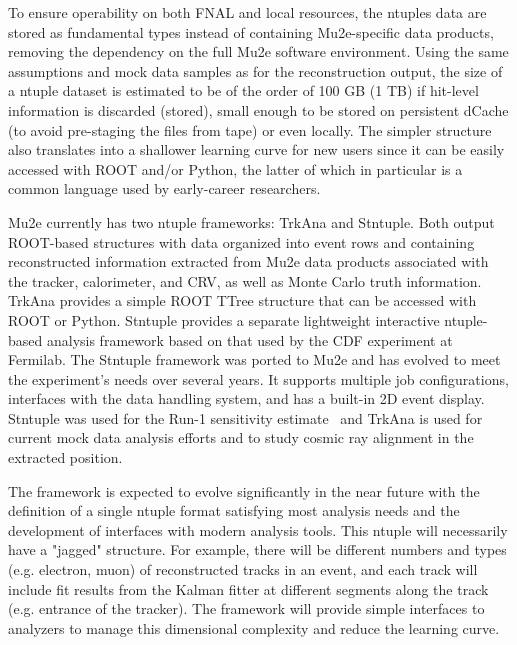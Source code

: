 To ensure operability on both FNAL and local resources, the ntuples data are stored as fundamental types instead of containing Mu2e-specific data products, removing the dependency on the full Mu2e software environment. Using the same assumptions and mock data samples as for the reconstruction output, the size of a ntuple dataset is estimated to be of the order of 100 GB (1 TB) if hit-level information is discarded (stored), small enough to be stored on persistent dCache (to avoid pre-staging the files from tape) or even locally. The simpler structure also translates into a shallower learning curve for new users since it can be easily accessed with ROOT and/or Python, the latter of which in particular is a common language used by early-career researchers.

Mu2e currently has two ntuple frameworks: TrkAna and Stntuple. Both output ROOT-based structures with data organized into event rows and containing reconstructed information extracted from Mu2e data products associated with the tracker, calorimeter, and CRV, as well as Monte Carlo truth information. TrkAna provides a simple ROOT TTree structure that can be accessed with ROOT or Python. Stntuple provides a separate lightweight interactive ntuple-based analysis framework based on that used by the CDF experiment at Fermilab. The Stntuple framework was ported to Mu2e and has evolved to meet the experiment's needs over several years. It supports multiple job configurations, interfaces with the data handling system, and has a built-in 2D event display. Stntuple was used for the Run-1 sensitivity estimate~\cite{Mu2e:2022ggl} and TrkAna is used for current mock data analysis efforts and to study cosmic ray alignment in the extracted position.

The framework is expected to evolve significantly in the near future with the definition of a single ntuple format satisfying most analysis needs and the development of interfaces with  modern analysis tools. This ntuple will necessarily have a "jagged" structure. For example, there will be different numbers and types (e.g. electron, muon) of reconstructed tracks in an event, and each track will include fit results from the Kalman fitter at different segments along the track (e.g. entrance of the tracker). The framework will provide simple interfaces to analyzers to manage this dimensional complexity and reduce the learning curve.

